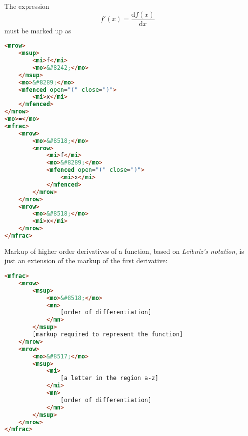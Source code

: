 \documentclass[english,a4paper,11pt]{article}
\begin{document}

\begin{examples}
The expression
\begin{equation}
f'(x) = \frac{\text{d}f(x)}{\text{d}x}
\end{equation}
must be marked up as
\begin{lstlisting}[language=HTML]
<mrow>
	<msup>
		<mi>f</mi>
		<mo>&#8242;</mo>
	</msup>
	<mo>&#8289;</mo>
	<mfenced open="(" close=")">
		<mi>x</mi>
	</mfenced>
</mrow>
<mo>=</mo>
<mfrac>
	<mrow>
		<mo>&#8518;</mo>
		<mrow>
			<mi>f</mi>
			<mo>&#8289;</mo>
			<mfenced open="(" close=")">
				<mi>x</mi>
			</mfenced>
		</mrow>
	</mrow>
	<mrow>
		<mo>&#8518;</mo>
		<mi>x</mi>
	</mrow>
</mfrac>
\end{lstlisting}
\end{examples}

Markup of higher order derivatives of a function, based on \emph{Leibniz's notation}, is just an extension of the markup of the first derivative:
\begin{lstlisting}[language=HTML]
<mfrac>
	<mrow>
		<msup>
			<mo>&#8518;</mo>
			<mn>
				[order of differentiation]
			</mn>
		</msup>
		[markup required to represent the function]
	</mrow>
	<mrow>
		<mo>&#8517;</mo>
		<msup>
			<mi>
				[a letter in the region a-z]
			</mi>
			<mn>
				[order of differentiation]
			</mn>
		</msup>
	</mrow>
</mfrac>
\end{lstlisting}
\end{document}
